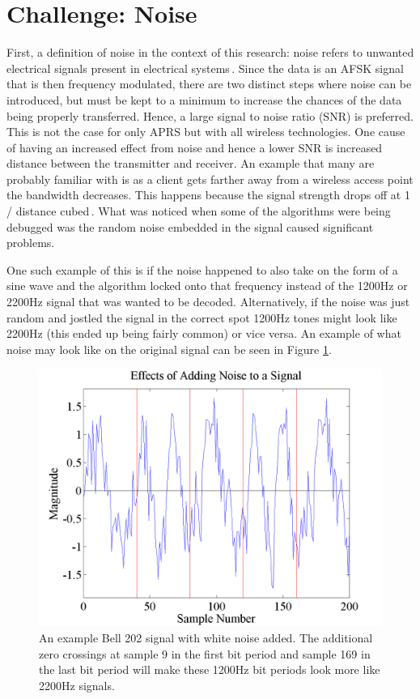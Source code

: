 \section{Challenge: Noise}
First, a definition of noise in the context of this research: noise refers to unwanted electrical signals present in electrical systems\,\cite{Sklar1988}. Since the data is an AFSK signal that is then frequency modulated, there are two distinct steps where noise can be introduced, but must be kept to a minimum to increase the chances of the data being properly transferred. Hence, a large signal to noise ratio (SNR) is preferred. This is not the case for only APRS but with all wireless technologies. One cause of having an increased effect from noise and hence a lower SNR is increased distance between the transmitter and receiver. An example that many are probably familiar with is as a client gets farther away from a wireless access point the bandwidth decreases. This happens because the signal strength drops off at 1 / distance cubed\,\cite{4Gon}. What was noticed when some of the algorithms were being debugged was the random noise embedded in the signal caused significant problems.

One such example of this is if the noise happened to also take on the form of a sine wave and the algorithm locked onto that frequency instead of the 1200Hz or 2200Hz signal that was wanted to be decoded. Alternatively, if the noise was just random and jostled the signal in the correct spot 1200Hz tones might look like 2200Hz (this ended up being fairly common) or vice versa. An example of what noise may look like on the original signal can be seen in Figure \ref{noiseExample}.
\begin{figure}
  \centering
	\includegraphics[width=0.75\linewidth]{images/EffectsofAddingNoisetoaSignal.png} 
	\caption[An example Bell 202 signal with white noise added.]{An example Bell 202 signal with white noise added. The additional zero crossings at sample 9 in the first bit period and sample 169 in the last bit period will make these 1200Hz bit periods look more like 2200Hz signals.}
   \label{noiseExample}
\end{figure}

